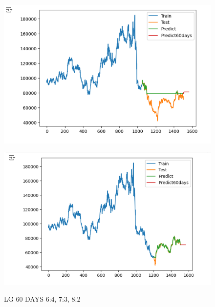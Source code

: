 \documentclass{article}
\begin{document}
\begin{multicols}{2}
\begin{figure}[H]
\begin{minipage}{0.15\textwidth}
    \label{fig:1}
    \end{minipage}%
    \begin{minipage}{0.15\textwidth}
    \centering
    \includegraphics[width=1\textwidth]{Image/GradientBoosting/LG_60_7_3_GradientBoostingRegressor.png}
  
    \label{fig:2}
    \end{minipage}%
    \begin{minipage}{0.15\textwidth}
    \centering
    \includegraphics[width=1\textwidth]{Image/GradientBoosting/LG_60_8_2_GradientBoostingRegressor.png}

    \label{fig:3}
    \end{minipage}
    \caption{LG 60 DAYS  6:4, 7:3, 8:2 }
\end{figure}


\end{multicols}
\end{document}
